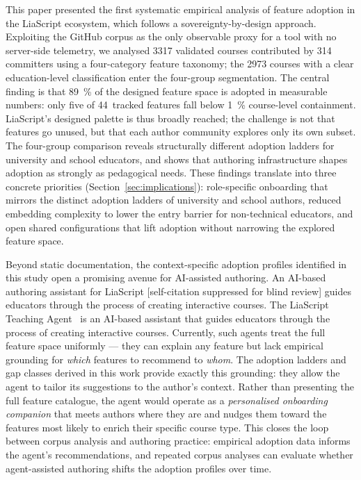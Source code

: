 
This paper presented the first systematic empirical analysis of feature
adoption in the LiaScript ecosystem, which follows a sovereignty-by-design approach.
Exploiting the GitHub corpus as the only observable proxy for a
tool with no server-side telemetry, we analysed \num{3317} validated
courses contributed by \num{314} committers using a four-category
feature taxonomy; the \num{2973} courses with a clear education-level
classification enter the four-group segmentation.
The central finding is that \SI{89}{\percent} of the designed feature
space is adopted in measurable numbers: only five of 44~tracked
features fall below \SI{1}{\percent} course-level containment.
LiaScript's designed palette is thus broadly reached; the challenge
is not that features go unused, but that each author community
explores only its own subset.
The four-group comparison reveals structurally different adoption
ladders for university and school educators, and shows that authoring
infrastructure shapes adoption as strongly as pedagogical
needs.
These findings translate into three concrete priorities
(Section~\ref{sec:implications}):
role-specific onboarding that mirrors the distinct adoption ladders
of university and school authors,
reduced embedding complexity to lower the entry barrier for
non-technical educators,
and open shared configurations that lift adoption without narrowing
the explored feature space.

Beyond static documentation, the context-specific adoption profiles
identified in this study open a promising avenue for AI-assisted
authoring.
\ifanonymous
{\color{orange}An AI-based authoring assistant for LiaScript
[self-citation suppressed for blind review] guides educators through
the process of creating interactive courses.}
\else
The LiaScript Teaching Agent~\cite{TeachingAgent2025} is an AI-based
assistant that guides educators through the process of creating
interactive courses.
\fi
Currently, such agents treat the full feature space uniformly ---
they can explain any feature but lack empirical grounding for
\emph{which} features to recommend to \emph{whom}.
The adoption ladders and gap classes derived in this work provide
exactly this grounding: they allow the agent to tailor its
suggestions to the author's context.
Rather than presenting the full feature catalogue, the agent would
operate as a \emph{personalised onboarding companion} that meets
authors where they are and nudges them toward the features most
likely to enrich their specific course type.
This closes the loop between corpus analysis and authoring practice:
empirical adoption data informs the agent's recommendations, and
repeated corpus analyses can evaluate whether agent-assisted
authoring shifts the adoption profiles over time.

